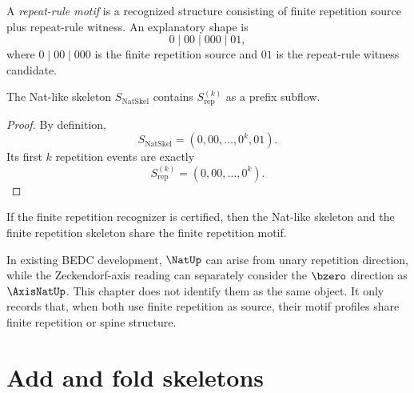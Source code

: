 \begin{definition}
\label{def:case-studies-repeat-rule-motif}
A \emph{repeat-rule motif} is a recognized structure consisting of finite repetition source plus repeat-rule witness. An explanatory shape is
$$
  0\mid 00\mid 000\mid 01,
$$
where $0\mid 00\mid 000$ is the finite repetition source and $01$ is the repeat-rule witness candidate.
\end{definition}

\begin{proposition}
\label{prop:case-studies-nat-extends-repetition}
The Nat-like skeleton $S_{\mathrm{NatSkel}}$ contains $S_{\mathrm{rep}}^{(k)}$ as a prefix subflow.
\end{proposition}

\begin{proof}
By definition,
$$
  S_{\mathrm{NatSkel}}=(0,00,\ldots,0^k,01).
$$
Its first $k$ repetition events are exactly
$$
  S_{\mathrm{rep}}^{(k)}=(0,00,\ldots,0^k).
$$
\end{proof}

\begin{corollary}
\label{cor:case-studies-nat-repetition-share-prefix}
If the finite repetition recognizer is certified, then the Nat-like skeleton and the finite repetition skeleton share the finite repetition motif.
\end{corollary}

\begin{remark}
\label{rem:case-studies-nat-axisnat}
In existing BEDC development, $\NatUp$ can arise from unary repetition direction, while the Zeckendorf-axis reading can separately consider the $\bzero$ direction as $\AxisNatUp$. This chapter does not identify them as the same object. It only records that, when both use finite repetition as source, their motif profiles share finite repetition or spine structure.
\end{remark}

\section{Add and fold skeletons}
\label{sec:case-studies-add-fold}

